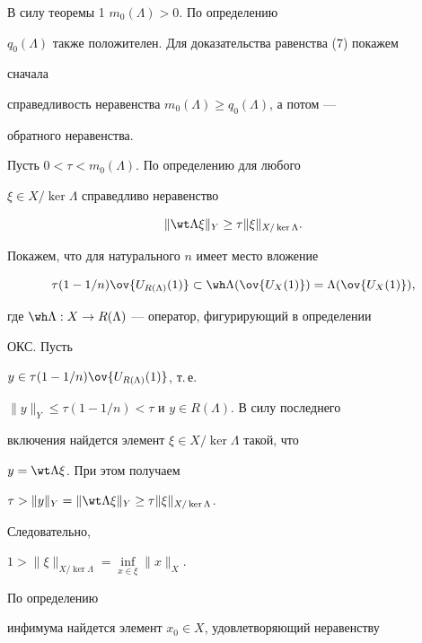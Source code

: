  


\begin{pf} В силу теоремы 1\; $m_0(\Lambda)>0$. По определению  


$q_0(\Lambda)$ также положителен. Для доказательства равенства (7) покажем 


сначала 


справедливость неравенства $m_0(\Lambda)\ge q_0(\Lambda)$, а потом --- 


обратного неравенства. 


 


Пусть $0<\tau<m_0(\Lambda)$. По определению для любого 


$\xi\in X/\ker\Lambda$ справедливо неравенство 


\begin{equation} 


\|\wt\Lambda\xi\|_Y\ge\tau\|\xi\|_{X/\ker\Lambda}. 


\end{equation} 


 


Покажем, что для натурального $n$ имеет место вложение 


\begin{equation} 


\tau(1-1/n)\ov{U_{R(\Lambda)}(1)}\subset\wh\Lambda 


(\ov{U_X(1)})=\Lambda(\ov{U_X(1)}), 


\end{equation} 


где $\wh\Lambda:X\to R(\Lambda)$ --- оператор, фигурирующий в определении 


ОКС. Пусть  


$y\in\tau(1-1/n)\ov{U_{R(\Lambda)}(1)}$, т.\,е. 


$\|y\|_Y\le\tau(1-1/n)<\tau$ и $y\in R(\Lambda)$. В силу последнего 


включения найдется элемент $\xi\in X/\ker\Lambda$ такой, что 


$y=\wt\Lambda\xi$. При этом получаем 


$\tau>\|y\|_Y=\|\wt\Lambda\xi\|_Y\ge\tau\|\xi\|_{X/\ker\Lambda}$. 


Следовательно, 


$1>\|\xi\|_{X/\ker\Lambda}=\inf\limits_{x\in\xi}\|x\|_X$. 


По определению 


инфимума найдется элемент $x_0\in X$, удовлетворяющий неравенству  



\end{pf}
